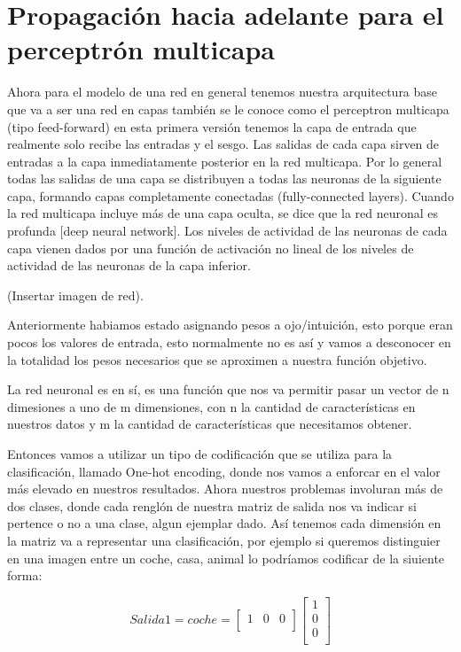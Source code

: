 \section{Propagación hacia adelante para el perceptrón multicapa}

Ahora para el modelo de una red en general tenemos nuestra arquitectura base que va a ser una red en capas también se le conoce como el perceptron multicapa (tipo feed-forward) en esta primera versión tenemos la capa de entrada que realmente solo recibe las entradas y el sesgo. Las salidas de cada capa sirven de entradas a la capa inmediatamente posterior en la red multicapa. Por lo general todas las salidas de una capa se distribuyen a todas las neuronas de la siguiente capa, formando capas completamente conectadas (fully-connected layers).
Cuando la red multicapa incluye más de una capa oculta, se dice que la red neuronal es profunda [deep neural network].
Los niveles de actividad de las neuronas de cada capa vienen dados por una función de activación no lineal de los niveles de actividad de las neuronas de la capa inferior.

(Insertar imagen de red).

Anteriormente habiamos estado asignando pesos a ojo/intuición, esto porque eran pocos los valores de entrada, esto normalmente no es así y vamos a desconocer en la totalidad los pesos necesarios que se aproximen a nuestra función objetivo.  

La red neuronal es en sí, es una función que nos va permitir pasar un vector de n dimesiones a uno de m dimensiones, con n la cantidad de características en nuestros datos y m la cantidad de características que necesitamos obtener.  

Entonces vamos a utilizar un tipo de codificación que se utiliza para la clasificación, llamado One-hot encoding, donde nos vamos a enforcar en el valor más elevado en nuestros resultados. Ahora nuestros problemas involuran más de dos clases, donde cada renglón de nuestra matriz de salida nos va indicar si pertence o no a una clase, algun ejemplar dado. Así tenemos cada dimensión en la matriz va a representar una clasificación, por ejemplo si queremos distinguier en una imagen entre un coche, casa, animal lo podríamos codificar de la siuiente forma:

$$
Salida 1 = coche =
\begin{bmatrix}
  1 & 0 & 0 \\
  \end{bmatrix}
\begin{bmatrix}
  1 \\ 
  0\\ 
  0 \\
  \end{bmatrix}
$$

